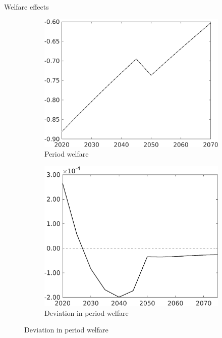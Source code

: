\documentclass[11pt,aspectratio=169]{beamer}
\begin{document}
\begin{frame}{Welfare effects}
\begin{figure}
		\begin{subfigure}{0.32\textwidth}		
		\caption{Period welfare}
		\includegraphics[width=1\textwidth]{../codding_model/own_basedOnFried/optimalPol_010922_revision/figures/all_13Sept22_Tplus30/SWF_OPT_COMPtaul_regime4_spillover0_knspil0_noskill0_sep0_xgrowth0_PV1_etaa0.79_lgd0.png}
	\end{subfigure}	
	\begin{subfigure}{0.32\textwidth}		
	\caption{Deviation in period welfare}
	\includegraphics[width=1\textwidth]{../codding_model/own_basedOnFried/optimalPol_010922_revision/figures/all_13Sept22_Tplus30/SWF_OPT_COMPtaulPer_regime4_spillover0_knspil0_noskill0_sep0_xgrowth0_PV1_etaa0.79.png}
\end{subfigure}
\end{figure}
\end{frame}
\end{document}
